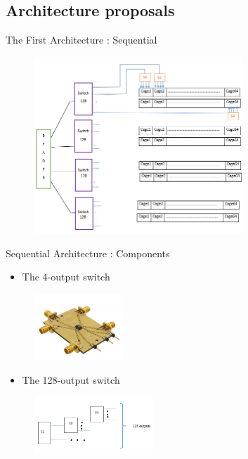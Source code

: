 \documentclass[utf8,compress]{beamer}
\begin{document}
\subsection{Architecture proposals}

\begin{frame}{The First Architecture : Sequential}
    \begin{figure}[h]
        \includegraphics[width=0.7\textwidth]{archi1.png}
    \end{figure}
\end{frame}

\begin{frame}[containsverbatim]{Sequential Architecture : Components }
 \begin{itemize}
    \item The 4-output switch
    \end{itemize}
    \begin{figure}[h]
        \includegraphics[width=0.3\textwidth]{switch4.png}
    \end{figure}

 \begin{itemize}
    \item The 128-output switch
    \end{itemize}   
    \begin{figure}[h]
        \includegraphics[width=0.4\textwidth]{switch128.png}
    \end{figure}
\end{frame}
\end{document}
